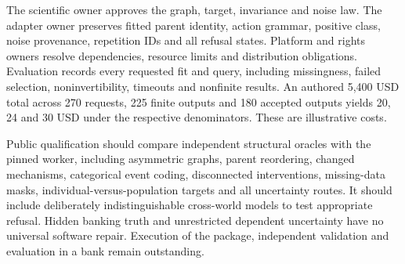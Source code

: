 The scientific owner approves the graph, target, invariance and noise law.
The adapter owner preserves fitted parent identity, action grammar,
positive class, noise provenance, repetition IDs and all refusal states.
Platform and rights owners resolve dependencies, resource limits and
distribution obligations. Evaluation records every requested fit and query,
including missingness, failed selection, noninvertibility, timeouts and
nonfinite results. An authored 5,400 USD total across 270 requests,
225 finite outputs and 180 accepted outputs yields 20, 24 and 30 USD
under the respective denominators. These are illustrative costs.
\citep{exec24_gcm_choice}

Public qualification should compare independent structural oracles with
the pinned worker, including asymmetric graphs, parent reordering,
changed mechanisms, categorical event coding, disconnected interventions,
missing-data masks, individual-versus-population targets and all uncertainty
routes. It should include deliberately indistinguishable cross-world models
to test appropriate refusal. Hidden banking truth and unrestricted dependent
uncertainty have no universal software repair. Execution of the package, independent validation and evaluation in a bank remain outstanding.\citep{exec24_gcm_choice}
